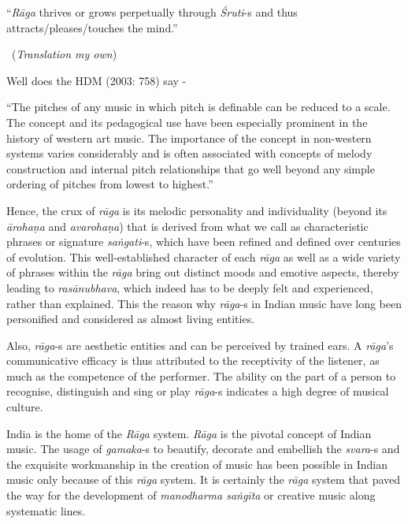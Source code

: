\begin{myquote}
“\textit{Rāga} thrives or grows perpetually through \textit{Śruti}-s and thus attracts/\break pleases/touches the mind.” 

~\hfill (\textit{Translation my own})
\end{myquote}

Well does the HDM (2003: 758) say -

\begin{myquote}
“The pitches of any music in which pitch is definable can be reduced to a scale. The concept and its pedagogical use have been especially prominent in the history of western art music. The importance of the concept in non-western systems varies considerably and is often associated with concepts of melody construction and internal pitch relationships that go well beyond any simple ordering of pitches from lowest to highest.” 
\end{myquote}

Hence, the crux of \textit{rāga} is its melodic personality and individuality (beyond its \textit{ārohaṇa} and \textit{avarohaṇa}) that is derived from what we call as characteristic phrases or signature \textit{saṅgati}-s, which have been refined and defined over centuries of evolution. This well-established character of each \textit{rāga} as well as a wide variety of phrases within the \textit{rāga} bring out distinct moods and emotive aspects, thereby leading to \textit{rasānubhava}, which indeed has to be deeply felt and experienced, rather than explained. This the reason why \textit{rāga}-s in Indian music have long been personified and considered as almost living entities. 

Also, \textit{rāga}-s are aesthetic entities and can be perceived by trained ears. A \textit{rāga}’s communicative efficacy is thus attributed to the receptivity of the listener, as much as the competence of the performer. The ability on the part of a person to recognise, distinguish and sing or play \textit{rāga}-s indicates a high degree of musical culture.

India is the home of the \textit{Rāga} system. \textit{Rāga} is the pivotal concept of Indian music. The usage of \textit{gamaka}-s to beautify, decorate and embellish the \textit{svara}-s and the exquisite workmanship in the creation of music has been possible in Indian music only because of this \textit{rāga} system. It is certainly the \textit{rāga} system that paved the way for the development of \textit{manodharma saṅgīta} or creative music along systematic lines.

